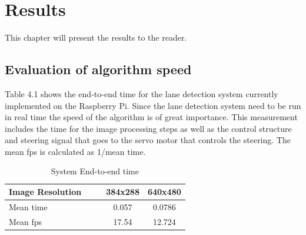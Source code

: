 \chapter{Results}
\label{sec:results}

This chapter will present the results to the reader.


\section{Evaluation of algorithm speed}
Table 4.1 shows the end-to-end time for the lane detection system currently implemented on the Raspberry Pi. Since the lane detection system need to be run in real time the speed of the algorithm is of great importance. This measurement includes the time for the image processing steps as well as the control structure and steering signal that goes to the servo motor that controls the steering. The mean fps is calculated as 1/mean time.


\begin{table}[H]
\centering
\caption{System End-to-end time}
\label{End-to-end time}
\begin{tabular}{@{} l *4c @{}}
\toprule
Image Resolution   & & & 384x288 & 640x480  \\ 
\midrule
 Mean time & & & 0.057 & 0.0786 \\ 
 Mean fps & & & 17.54 & 12.724 \\
\bottomrule
 \end{tabular}
\end{table}



